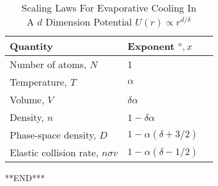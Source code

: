 \documentclass[12]{article}
\begin{document}
\begin{table}[htbp]
  \centering
  \caption{Scaling Laws For Evaporative Cooling In \\ A $d$ Dimension Potential $U(r)\propto r^{d/ \delta}$ }
  \begin{tabular}{|l|l|c|}
    \hline
    Quantity & Exponent $^a, x$ \\
   \hline Number of atoms, $N$ & 1 \\
Temperature, $T$ & $\alpha$ \\
Volume, $V$ & $\delta \alpha$ \\
Density, $n$ & $1-\delta \alpha$ \\
Phase-space density, $D$ & $1-\alpha(\delta+3 / 2)$ \\
Elastic collision rate, $n \sigma v$ & $1-\alpha(\delta-1 / 2)$ \\
\hline
  \end{tabular}
\end{table}

























\begin{center}%
	\Large***END***
\end{center}
\end{document}
